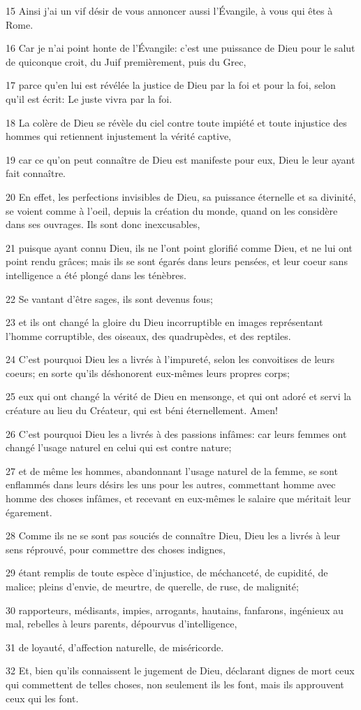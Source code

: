 \par 15 Ainsi j'ai un vif désir de vous annoncer aussi l'Évangile, à vous qui êtes à Rome.
\par 16 Car je n'ai point honte de l'Évangile: c'est une puissance de Dieu pour le salut de quiconque croit, du Juif premièrement, puis du Grec,
\par 17 parce qu'en lui est révélée la justice de Dieu par la foi et pour la foi, selon qu'il est écrit: Le juste vivra par la foi.
\par 18 La colère de Dieu se révèle du ciel contre toute impiété et toute injustice des hommes qui retiennent injustement la vérité captive,
\par 19 car ce qu'on peut connaître de Dieu est manifeste pour eux, Dieu le leur ayant fait connaître.
\par 20 En effet, les perfections invisibles de Dieu, sa puissance éternelle et sa divinité, se voient comme à l'oeil, depuis la création du monde, quand on les considère dans ses ouvrages. Ils sont donc inexcusables,
\par 21 puisque ayant connu Dieu, ils ne l'ont point glorifié comme Dieu, et ne lui ont point rendu grâces; mais ils se sont égarés dans leurs pensées, et leur coeur sans intelligence a été plongé dans les ténèbres.
\par 22 Se vantant d'être sages, ils sont devenus fous;
\par 23 et ils ont changé la gloire du Dieu incorruptible en images représentant l'homme corruptible, des oiseaux, des quadrupèdes, et des reptiles.
\par 24 C'est pourquoi Dieu les a livrés à l'impureté, selon les convoitises de leurs coeurs; en sorte qu'ils déshonorent eux-mêmes leurs propres corps;
\par 25 eux qui ont changé la vérité de Dieu en mensonge, et qui ont adoré et servi la créature au lieu du Créateur, qui est béni éternellement. Amen!
\par 26 C'est pourquoi Dieu les a livrés à des passions infâmes: car leurs femmes ont changé l'usage naturel en celui qui est contre nature;
\par 27 et de même les hommes, abandonnant l'usage naturel de la femme, se sont enflammés dans leurs désirs les uns pour les autres, commettant homme avec homme des choses infâmes, et recevant en eux-mêmes le salaire que méritait leur égarement.
\par 28 Comme ils ne se sont pas souciés de connaître Dieu, Dieu les a livrés à leur sens réprouvé, pour commettre des choses indignes,
\par 29 étant remplis de toute espèce d'injustice, de méchanceté, de cupidité, de malice; pleins d'envie, de meurtre, de querelle, de ruse, de malignité;
\par 30 rapporteurs, médisants, impies, arrogants, hautains, fanfarons, ingénieux au mal, rebelles à leurs parents, dépourvus d'intelligence,
\par 31 de loyauté, d'affection naturelle, de miséricorde.
\par 32 Et, bien qu'ils connaissent le jugement de Dieu, déclarant dignes de mort ceux qui commettent de telles choses, non seulement ils les font, mais ils approuvent ceux qui les font.

